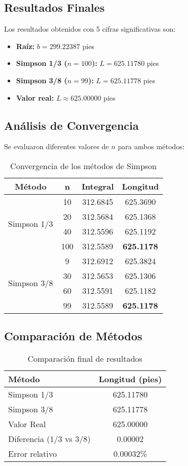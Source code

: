 \documentclass[conference]{IEEEtran}
\begin{document}
\subsection{Resultados Finales}

Los resultados obtenidos con 5 cifras significativas son:

\begin{itemize}
    \item \textbf{Raíz:} $b = 299.22387$ pies
    \item \textbf{Simpson 1/3 ($n=100$):} $L = 625.11780$ pies
    \item \textbf{Simpson 3/8 ($n=99$):} $L = 625.11778$ pies
    \item \textbf{Valor real:} $L \approx 625.00000$ pies
\end{itemize}

\subsection{Análisis de Convergencia}

Se evaluaron diferentes valores de $n$ para ambos métodos:

\begin{table}[H]
\centering
\caption{Convergencia de los métodos de Simpson}
\small
\begin{tabular}{|c|c|c|c|}
\hline
\textbf{Método} & \textbf{n} & \textbf{Integral} & \textbf{Longitud} \\
\hline
\multirow{4}{*}{Simpson 1/3} 
& 10 & 312.6845 & 625.3690 \\
& 20 & 312.5684 & 625.1368 \\
& 40 & 312.5596 & 625.1192 \\
& 100 & 312.5589 & \textbf{625.1178} \\
\hline
\multirow{4}{*}{Simpson 3/8} 
& 9 & 312.6912 & 625.3824 \\
& 30 & 312.5653 & 625.1306 \\
& 60 & 312.5591 & 625.1182 \\
& 99 & 312.5589 & \textbf{625.1178} \\
\hline
\end{tabular}
\end{table}

\subsection{Comparación de Métodos}

\begin{table}[H]
\centering
\caption{Comparación final de resultados}
\begin{tabular}{|l|c|}
\hline
\textbf{Método} & \textbf{Longitud (pies)} \\
\hline
Simpson 1/3 & 625.11780 \\
Simpson 3/8 & 625.11778 \\
Valor Real & 625.00000 \\
\hline
Diferencia (1/3 vs 3/8) & 0.00002 \\
Error relativo & 0.00032\% \\
\hline
\end{tabular}
\end{table}
\end{document}
